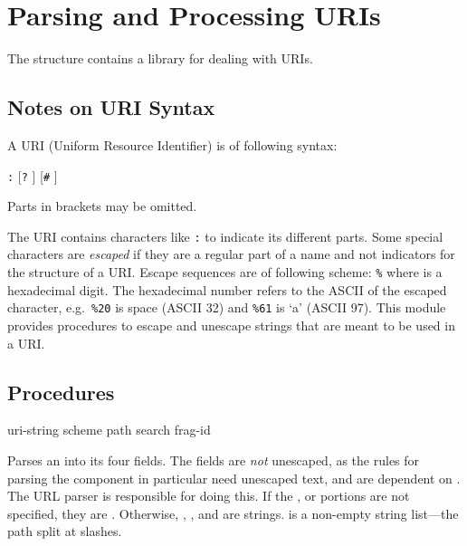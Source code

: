 \chapter{Parsing and Processing URIs}\label{cha:uri}

The  structure contains a library for dealing with URIs.

\section{Notes on URI Syntax}

A URI (Uniform Resource Identifier) is of following syntax:
%
\begin{inset}
 \verb|:|  [\verb|?| ] [\verb|#| ]
\end{inset}
%
Parts in brackets may be omitted.

The URI contains characters like \verb|:| to indicate its different
parts.  Some special characters are \emph{escaped} if they are a
regular part of a name and not indicators for the structure of a URI.
Escape sequences are of following scheme: \verb|%| where 
is a hexadecimal digit.  The hexadecimal number refers to the
ASCII of the escaped character, e.g.\ \verb|%20| is space (ASCII
32) and \verb|%61| is `a' (ASCII 97). This module
provides procedures to escape and unescape strings that are meant to
be used in a URI.

\section{Procedures}

 {uri-string } {scheme path search
    frag-id} \label{proc:parse-uri}
\begin{desc}
  Parses an  into its four fields.
  The fields are \emph{not} unescaped, as the rules for
  parsing the  component in particular need unescaped
  text, and are dependent on . The URL parser is
  responsible for doing this.  If the , 
  or  portions are not specified, they are \sharpf.
  Otherwise, , , and  are
  strings.  is a non-empty string list---the path split
  at slashes.
\end{desc}

